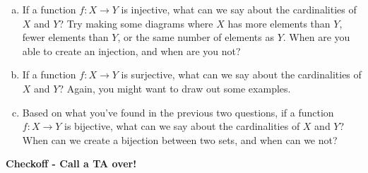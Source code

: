 \documentclass[12pt,letterpaper]{article}
\begin{document}
      \begin{enumerate}[a.]
      \item If a function $f : X \rightarrow Y$ is injective, what can we say about the cardinalities of $X$ and $Y$? Try making some diagrams where $X$ has more elements than $Y$, fewer elements than $Y$, or the same number of elements as $Y$. When are you able to create an injection, and when are you not?
      
      \begin{mdframed} \vspace{2cm} \end{mdframed}
      
      \item If a function $f : X \rightarrow Y$ is surjective, what can we say about the cardinalities of $X$ and $Y$? Again, you might want to draw out some examples.
      
      \begin{mdframed} \vspace{2cm} \end{mdframed}
      
      \item Based on what you've found in the previous two questions, if a function $f: X \rightarrow Y$ is bijective, what can we say about the cardinalities of $X$ and $Y$? When can we create a bijection between two sets, and when can we not?
      
      \begin{mdframed} \vspace{2cm} \end{mdframed}

      \end{enumerate}
      
\textbf{Checkoff - Call a TA over!}
\end{document}
